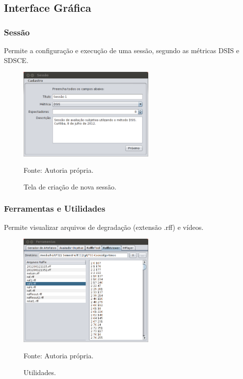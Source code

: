 \subsection{Interface Gráfica}
        \begin{frame}\frametitle{Sessão}
            Permite a configuração e execução de uma sessão, segundo as métricas DSIS e SDSCE.
		    \begin{figure}
			    \includegraphics[width=0.6\textwidth]{./imgs/sessao1.png}
			    \caption{Tela de criação de nova sessão.}
			    \tiny
			    Fonte: Autoria própria.
		    \end{figure}
        \end{frame}
        
        \begin{frame}\frametitle{Ferramentas e Utilidades}
            Permite visualizar arquivos de degradação (extensão .rff) e vídeos.
		    \begin{figure}
			    \includegraphics[width=0.6\textwidth]{./imgs/ferramentas-viewer.png}
			    \caption{Utilidades.}
			    \tiny
			    Fonte: Autoria própria.
		    \end{figure}
        \end{frame}
        

